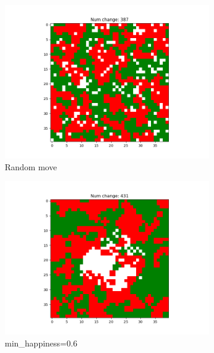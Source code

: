 \documentclass[11pt]{article}
\begin{document}
	\begin{figure}[h]
		\centering
		\begin{subfigure}{0.14\textwidth}
			\includegraphics[width=\linewidth]{final_random.png}
			\caption{\centering Random move}
			\label{distance_finalrandom}
		\end{subfigure}\hfill
		\begin{subfigure}{0.14\textwidth}
			\includegraphics[width=\linewidth]{policy4_final_min6.png}
			\caption{\centering min_happiness=0.6}
			\label{distance_finalmin6}
		\end{subfigure}\hfill
		\begin{subfigure}{0.14\textwidth}

\end{subfigure}
\end{figure}
\end{document}
